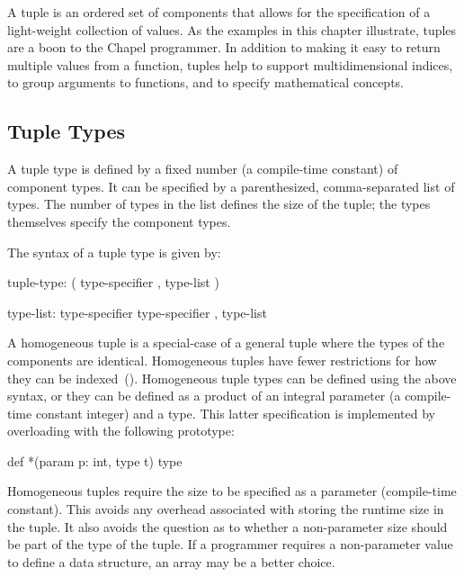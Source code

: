 \label{Tuples}

A tuple is an ordered set of components that allows for the
specification of a light-weight collection of values.  As the examples
in this chapter illustrate, tuples are a boon to the Chapel
programmer.  In addition to making it easy to return multiple values
from a function, tuples help to support multidimensional indices, to
group arguments to functions, and to specify mathematical concepts.

\subsection{Tuple Types}
\label{Tuple_Types}

A tuple type is defined by a fixed number (a compile-time constant) of
component types.  It can be specified by a parenthesized,
comma-separated list of types.  The number of types in the list
defines the size of the tuple; the types themselves specify the
component types.

The syntax of a tuple type is given by:
\begin{syntax}
tuple-type:
  ( type-specifier , type-list )

type-list:
  type-specifier
  type-specifier , type-list
\end{syntax}

A homogeneous tuple is a special-case of a general tuple where the
types of the components are identical.  Homogeneous tuples have fewer
restrictions for how they can be indexed~().
Homogeneous tuple types can be defined using the above syntax, or they
can be defined as a product of an integral parameter (a compile-time
constant integer) and a type.  This latter specification is
implemented by overloading \chpl{*} with the following prototype:
\begin{chapel}
def *(param p: int, type t) type
\end{chapel}

\begin{rationale}
Homogeneous tuples require the size to be specified as a parameter
(compile-time constant).  This avoids any overhead associated with
storing the runtime size in the tuple.  It also avoids the question as
to whether a non-parameter size should be part of the type of the
tuple.  If a programmer requires a non-parameter value to define a
data structure, an array may be a better choice.
\end{rationale}


